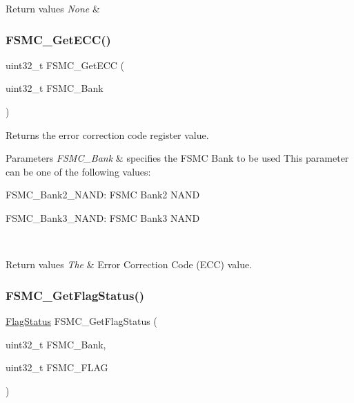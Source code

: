\begin{DoxyRetVals}{Return values}
{\em None} & \\
\hline
\end{DoxyRetVals}
\mbox{\label{group___f_s_m_c___private___functions_gaad6d4f5b5a41684ce053fea55bdb98d8}} 
\subsubsection{\texorpdfstring{FSMC\_GetECC()}{FSMC\_GetECC()}}
{\footnotesize\ttfamily uint32\+\_\+t F\+S\+M\+C\+\_\+\+Get\+E\+CC (\begin{DoxyParamCaption}\item[{uint32\+\_\+t}]{F\+S\+M\+C\+\_\+\+Bank }\end{DoxyParamCaption})}



Returns the error correction code register value. 


\begin{DoxyParams}{Parameters}
{\em F\+S\+M\+C\+\_\+\+Bank} & specifies the F\+S\+MC Bank to be used This parameter can be one of the following values\+: \begin{DoxyItemize}
\item F\+S\+M\+C\+\_\+\+Bank2\+\_\+\+N\+A\+ND\+: F\+S\+MC Bank2 N\+A\+ND \item F\+S\+M\+C\+\_\+\+Bank3\+\_\+\+N\+A\+ND\+: F\+S\+MC Bank3 N\+A\+ND \end{DoxyItemize}
\\
\hline
\end{DoxyParams}

\begin{DoxyRetVals}{Return values}
{\em The} & Error Correction Code (E\+CC) value. \\
\hline
\end{DoxyRetVals}
\mbox{\label{group___f_s_m_c___private___functions_gae00355115b078f483f0771057bb849c4}} 
\subsubsection{\texorpdfstring{FSMC\_GetFlagStatus()}{FSMC\_GetFlagStatus()}}
{\footnotesize\ttfamily \mbox{\hyperlink{group___exported__types_ga89136caac2e14c55151f527ac02daaff}{Flag\+Status}} F\+S\+M\+C\+\_\+\+Get\+Flag\+Status (\begin{DoxyParamCaption}\item[{uint32\+\_\+t}]{F\+S\+M\+C\+\_\+\+Bank,  }\item[{uint32\+\_\+t}]{F\+S\+M\+C\+\_\+\+F\+L\+AG }\end{DoxyParamCaption})}



